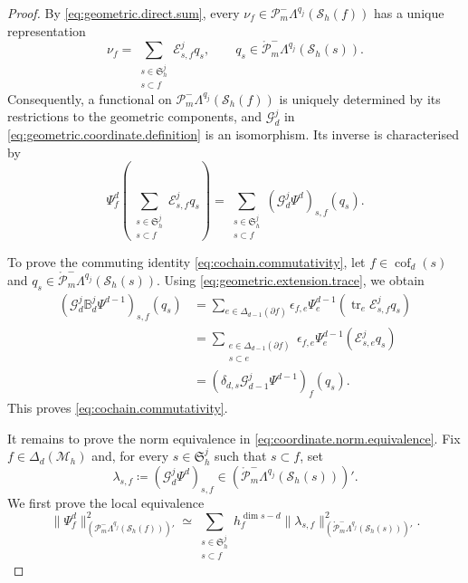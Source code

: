 \documentclass[10pt,a4paper]{amsart}
\newcommand{\FM}[1]{\Delta_{#1}}
\newcommand{\Mh}{\mathcal{M}_h}
\newcommand{\PLtrim}[2]{\mathcal{P}_{#1}^{-}\Lambda^{#2}}
\newcommand{\PLtrimz}[2]{\mathring{\mathcal P}_{#1}^{-}\Lambda^{#2}}
\newcommand{\Sh}{\mathcal{S}_h}
\newcommand{\cof}[1]{\operatorname{cof}_{#1}}
\newcommand{\trc}{\operatorname{tr}}
\begin{document}
\begin{proof}
By \eqref{eq:geometric.direct.sum}, every $\nu_f\in\PLtrim{m}{q_j}(\Sh(f))$ has a unique representation
\[
\nu_f
=
\sum_{\substack{
s\in\mathfrak S_h^j\\
s\subset f
}}
\mathcal E_{s,f}^jq_s,
\qquad
q_s\in\PLtrimz{m}{q_j}(\Sh(s)).
\]
Consequently, a functional on $\PLtrim{m}{q_j}(\Sh(f))$ is uniquely determined by its restrictions to the geometric components, and $\mathcal G_d^j$ in \eqref{eq:geometric.coordinate.definition} is an isomorphism.
Its inverse is characterised by
\[
\Psi_f^d
\left(
\sum_{\substack{
s\in\mathfrak S_h^j\\
s\subset f
}}
\mathcal E_{s,f}^jq_s
\right)
=
\sum_{\substack{
s\in\mathfrak S_h^j\\
s\subset f
}}
\left(
\mathcal G_d^j\Psi^d
\right)_{s,f}(q_s).
\]

To prove the commuting identity \eqref{eq:cochain.commutativity}, let $f\in\cof{d}(s)$ and $q_s\in\PLtrimz{m}{q_j}(\Sh(s))$.
Using \eqref{eq:geometric.extension.trace}, we obtain
\[
\begin{aligned}
\left(
\mathcal G_d^j\mathbb B_d^j\Psi^{d-1}
\right)_{s,f}(q_s)
&=
\sum_{e\in\FM{d-1}(\partial f)}
\epsilon_{f,e}
\Psi_e^{d-1}
\left(
\trc_e\mathcal E_{s,f}^jq_s
\right)
\\
&=
\sum_{\substack{
e\in\FM{d-1}(\partial f)\\
s\subset e
}}
\epsilon_{f,e}
\Psi_e^{d-1}
\left(
\mathcal E_{s,e}^jq_s
\right)
\\
&=
\left(
\delta_{d,s}\mathcal G_{d-1}^j\Psi^{d-1}
\right)_f(q_s).
\end{aligned}
\]
This proves \eqref{eq:cochain.commutativity}.

It remains to prove the norm equivalence in \eqref{eq:coordinate.norm.equivalence}.
Fix $f\in\FM{d}(\Mh)$ and, for every $s\in\mathfrak S_h^j$ such that $s\subset f$, set
\[
\lambda_{s,f}
\coloneqq
\left(
\mathcal G_d^j\Psi^d
\right)_{s,f}
\in
\left(
\PLtrimz{m}{q_j}(\Sh(s))
\right)'.
\]
We first prove the local equivalence
\begin{equation}\label{eq:local.coordinate.norm.equivalence}
\|\Psi_f^d\|_{(\PLtrim{m}{q_j}(\Sh(f)))'}^2
\simeq
\sum_{\substack{
s\in\mathfrak S_h^j\\
s\subset f
}}
h_f^{\dim s-d}
\|\lambda_{s,f}\|_
{\left(\PLtrimz{m}{q_j}(\Sh(s))\right)'}^2.
\end{equation}


\end{proof}
\end{document}
